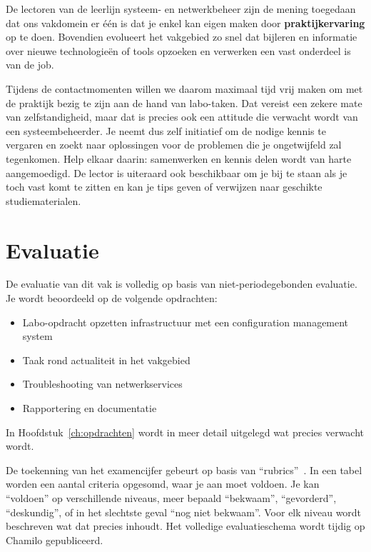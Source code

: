De lectoren van de leerlijn systeem- en netwerkbeheer zijn de
mening toegedaan dat ons vakdomein er één is dat je enkel kan eigen
maken door \textbf{praktijkervaring} op te doen. Bovendien evolueert het
vakgebied zo snel dat bijleren en informatie over nieuwe
technologieën of tools opzoeken en verwerken een vast onderdeel is van de job.

Tijdens de contactmomenten willen we daarom maximaal tijd vrij maken om
met de praktijk bezig te zijn aan de hand van labo-taken. Dat vereist
een zekere mate van zelfstandigheid, maar dat is precies ook een
attitude die verwacht wordt van een systeembeheerder. Je neemt dus zelf
initiatief om de nodige kennis te vergaren en zoekt naar oplossingen
voor de problemen die je ongetwijfeld zal tegenkomen. Help elkaar
daarin: samenwerken en kennis delen wordt van harte aangemoedigd. De
lector is uiteraard ook beschikbaar om je bij te staan als je toch vast
komt te zitten en kan je tips geven of verwijzen naar geschikte
studiematerialen.

\section{Evaluatie}
\label{sec:evaluatie}

De evaluatie van dit vak is volledig op basis van niet-periodegebonden
evaluatie. Je wordt beoordeeld op de volgende opdrachten:

\begin{itemize}
\item
  Labo-opdracht opzetten infrastructuur met een configuration management
  system
\item
  Taak rond actualiteit in het vakgebied
\item
  Troubleshooting van netwerkservices
\item
  Rapportering en documentatie
\end{itemize}

In Hoofdstuk~\ref{ch:opdrachten} wordt in meer detail uitgelegd wat precies verwacht wordt.

De toekenning van het examencijfer gebeurt op basis van ``rubrics''~\autocite{Andrade2000}. In een tabel worden een aantal criteria opgesomd, waar je aan moet voldoen. Je kan ``voldoen'' op verschillende niveaus, meer bepaald ``bekwaam'', ``gevorderd'', ``deskundig'', of in het slechtste geval ``nog niet bekwaam''. Voor elk niveau wordt beschreven wat dat precies inhoudt. Het volledige evaluatieschema wordt tijdig op Chamilo gepubliceerd.

